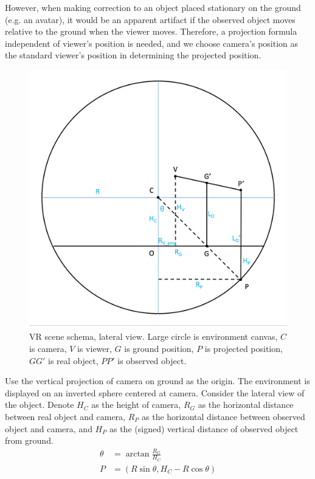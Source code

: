 \documentclass[12pt]{article}
\begin{document}
However, when making correction to an object placed stationary on the ground (e.g. an avatar), it would be an apparent artifact if the observed object moves relative to the ground when the viewer moves. Therefore, a projection formula independent of viewer's position is needed, and we choose camera's position as the standard viewer's position in determining the projected position. \\

\begin{figure}[h]
	\centering
	\includegraphics[scale=0.4]{lateral.png}
	\caption{VR scene schema, lateral view. Large circle is environment canvas, $C$ is camera, $V$ is viewer, $G$ is ground position, $P$ is projected position, $GG'$ is real object, $PP'$ is observed object. }
\end{figure}

Use the vertical projection of camera on ground as the origin. The environment is displayed on an inverted sphere centered at camera. Consider the lateral view of the object. Denote $H_C$ as the height of camera, $R_G$ as the horizontal distance between real object and camera, $R_P$ as the horizontal distance between observed object and camera, and $H_P$ as the (signed) vertical distance of observed object from ground. 
\begin{align*}
	\theta &= \arctan{\frac{R_G}{H_C}} \\
	P &= (R \sin{\theta}, H_C - R \cos{\theta})
\end{align*}
\end{document}
